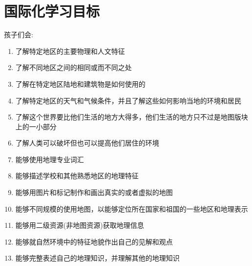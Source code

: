 \section{国际化学习目标}
   孩子们会:
   \begin{enumerate}
     \item  了解特定地区的主要物理和人文特征
     \item  了解不同地区之间的相同或而不同之处
     \item  了解在特定地区陆地和建筑物是如何使用的
     \item  了解特定地区的天气和气候条件，并且了解这些如何影响当地的环境和居民
     \item  了解这个世界要比他们生活的地方大得多，他们生活的地方只不过是地图版块上的一小部分
     \item  了解人类可以破坏但也可以提高他们居住的环境
     \item  能够使用地理专业词汇
     \item  能够描述学校和其他熟悉地区的地理特征
     \item  能够用图片和标记制作和画出真实的或者虚拟的地图
     \item  能够不同规模的使用地图，以能够定位所在国家和祖国的一些地区和地理表示
     \item  能够用二级资源(非地图资源)获取地理信息
     \item  能够就自然环境中的特征地貌作出自己的见解和观点
     \item  能够完整表述自己的地理知识，并理解其他的地理知识

   \end{enumerate}
